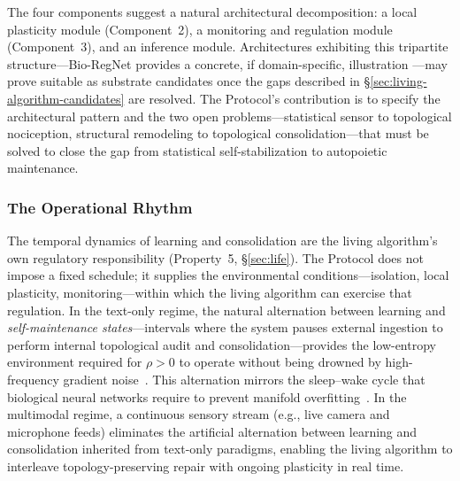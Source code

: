\documentclass{article}
\begin{document}
The four components suggest a natural architectural decomposition: a local plasticity module (Component~2), a monitoring and regulation module (Component~3), and an inference module. Architectures exhibiting this tripartite structure---Bio-RegNet provides a concrete, if domain-specific, illustration \citep{Ma2026bioregnet}---may prove suitable as substrate candidates once the gaps described in \S\ref{sec:living-algorithm-candidates} are resolved. The Protocol's contribution is to specify the architectural pattern and the two open problems---statistical sensor to topological nociception, structural remodeling to topological consolidation---that must be solved to close the gap from statistical self-stabilization to autopoietic maintenance.

\subsubsection{The Operational Rhythm}

The temporal dynamics of learning and consolidation are the living algorithm's own regulatory responsibility (Property~5, \S\ref{sec:life}). The Protocol does not impose a fixed schedule; it supplies the environmental conditions---isolation, local plasticity, monitoring---within which the living algorithm can exercise that regulation. In the text-only regime, the natural alternation between learning and \emph{self-maintenance states}---intervals where the system pauses external ingestion to perform internal topological audit and consolidation---provides the low-entropy environment required for $\rho > 0$ to operate without being drowned by high-frequency gradient noise~\citep{Shin2017generative}. This alternation mirrors the sleep--wake cycle that biological neural networks require to prevent manifold overfitting~\citep{Hoel2021overfitted}. In the multimodal regime, a continuous sensory stream (e.g., live camera and microphone feeds) eliminates the artificial alternation between learning and consolidation inherited from text-only paradigms, enabling the living algorithm to interleave topology-preserving repair with ongoing plasticity in real time.
\end{document}

